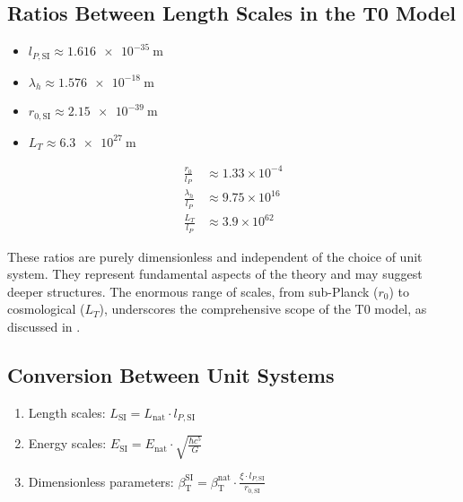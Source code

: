 \documentclass[12pt,a4paper]{article}
\newcommand{\betaT}{\beta_{\text{T}}}
\begin{document}
	\subsection{Ratios Between Length Scales in the T0 Model}
	\label{subsec:ratios_length}
	
	\begin{itemize}
		\item \(l_{P,\text{SI}} \approx \SI{1.616e-35}{\meter}\)
		\item \(\lambda_h \approx \SI{1.576e-18}{\meter}\)
		\item \(r_{0,\text{SI}} \approx \SI{2.15e-39}{\meter}\)
		\item \(L_T \approx \SI{6.3e27}{\meter}\)
	\end{itemize}
	\begin{align}
		\frac{r_0}{l_P} &\approx 1.33 \times 10^{-4} \\
		\frac{\lambda_h}{l_P} &\approx 9.75 \times 10^{16} \\
		\frac{L_T}{l_P} &\approx 3.9 \times 10^{62}
	\end{align}
	
	These ratios are purely dimensionless and independent of the choice of unit system. They represent fundamental aspects of the theory and may suggest deeper structures. The enormous range of scales, from sub-Planck (\(r_0\)) to cosmological (\(L_T\)), underscores the comprehensive scope of the T0 model, as discussed in \cite{pascher_planck_2025}.
	
	\subsection{Conversion Between Unit Systems}
	\label{subsec:conversion_scheme}
	
	\begin{tcolorbox}[colback=blue!5!white, colframe=blue!75!black, title=Conversion Scheme]
		\begin{enumerate}
			\item Length scales: \(L_{\text{SI}} = L_{\text{nat}} \cdot l_{P,\text{SI}}\)
			\item Energy scales: \(E_{\text{SI}} = E_{\text{nat}} \cdot \sqrt{\frac{\hbar c^5}{G}}\)
			\item Dimensionless parameters: \(\betaT^{\text{SI}} = \betaT^{\text{nat}} \cdot \frac{\xi \cdot l_{P,\text{SI}}}{r_{0,\text{SI}}}\)
		\end{enumerate}
	\end{tcolorbox}
	
\end{document}
